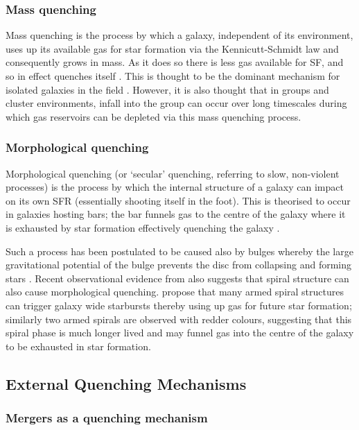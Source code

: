 \subsubsection{Mass quenching}\label{sec:massquench}
Mass quenching is the process by which a galaxy, independent of its environment, uses up its available gas for star formation via the Kennicutt-Schmidt law \citep{schmidt59, kennicutt98} and consequently grows in mass. As it does so there is less gas available for SF, and so in effect quenches itself \citep{peng12}. This is thought to be the dominant mechanism for isolated galaxies in the field \citep{kormendy04}. However, it is also thought that in groups and cluster environments, infall into the group can occur over long timescales during which gas reservoirs can be depleted via this mass quenching process.
 
\subsubsection{Morphological quenching}\label{sec:moprhquench}
Morphological quenching (or `secular' quenching, referring to slow, non-violent processes) is the process by which the internal structure of a galaxy can impact on its own SFR (essentially shooting itself in the foot). This is theorised to occur in galaxies hosting bars; the bar funnels gas to the centre of the galaxy \citep{athanassoula92a} where it is exhausted by star formation effectively quenching the galaxy \citep{zurita04, sheth05}. 

Such a process has been postulated to be caused also by bulges \citep{bluck14} whereby the large gravitational potential of the bulge prevents the disc from collapsing and forming stars \citep{Fang13}. Recent observational evidence from \citep{hart16} also suggests that spiral structure can also cause morphological quenching. \citeauthor{hart16} propose that many armed spiral structures can trigger galaxy wide starbursts thereby using up gas for future star formation; similarly two armed spirals are observed with redder colours, suggesting that this spiral phase is much longer lived and may funnel gas into the centre of the galaxy to be exhausted in star formation.  
  
\subsection{External Quenching Mechanisms}\label{sec:extquench}
  
\subsubsection{Mergers as a quenching mechanism}\label{sec:mergersquench}

